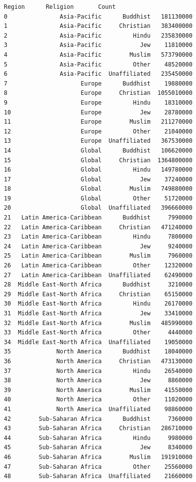 \documentclass[11pt]{article}
\begin{document}
    \begin{Verbatim}[commandchars=\\\{\}]
                      Region      Religion       Count
0               Asia-Pacific      Buddhist   181130000
1               Asia-Pacific     Christian   383400000
2               Asia-Pacific         Hindu   235830000
3               Asia-Pacific           Jew    11810000
4               Asia-Pacific        Muslim   573790000
5               Asia-Pacific         Other    48520000
6               Asia-Pacific  Unaffiliated   235450000
7                     Europe      Buddhist    19880000
8                     Europe     Christian  1055010000
9                     Europe         Hindu    18310000
10                    Europe           Jew    28780000
11                    Europe        Muslim   211270000
12                    Europe         Other    21040000
13                    Europe  Unaffiliated   367530000
14                    Global      Buddhist   106620000
15                    Global     Christian  1364800000
16                    Global         Hindu   149780000
17                    Global           Jew    37240000
18                    Global        Muslim   749880000
19                    Global         Other    51720000
20                    Global  Unaffiliated   396660000
21   Latin America-Caribbean      Buddhist     7990000
22   Latin America-Caribbean     Christian   471240000
23   Latin America-Caribbean         Hindu     7800000
24   Latin America-Caribbean           Jew     9240000
25   Latin America-Caribbean        Muslim     7960000
26   Latin America-Caribbean         Other    12320000
27   Latin America-Caribbean  Unaffiliated    62490000
28  Middle East-North Africa      Buddhist     3210000
29  Middle East-North Africa     Christian    65150000
30  Middle East-North Africa         Hindu    26170000
31  Middle East-North Africa           Jew    33410000
32  Middle East-North Africa        Muslim   485990000
33  Middle East-North Africa         Other     4440000
34  Middle East-North Africa  Unaffiliated    19050000
35             North America      Buddhist    18040000
36             North America     Christian   473130000
37             North America         Hindu    26540000
38             North America           Jew     8860000
39             North America        Muslim    41550000
40             North America         Other    11020000
41             North America  Unaffiliated    98860000
42        Sub-Saharan Africa      Buddhist     7360000
43        Sub-Saharan Africa     Christian   286710000
44        Sub-Saharan Africa         Hindu     9980000
45        Sub-Saharan Africa           Jew     8340000
46        Sub-Saharan Africa        Muslim   191910000
47        Sub-Saharan Africa         Other    25560000
48        Sub-Saharan Africa  Unaffiliated    21660000
    \end{Verbatim}
\end{document}
